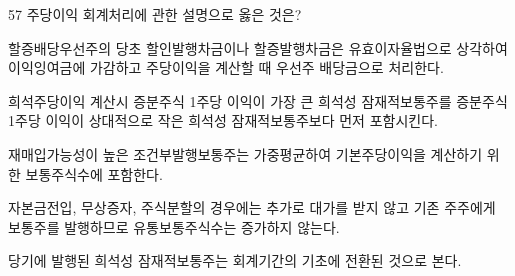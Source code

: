 \begin{question}{57}
주당이익 회계처리에 관한 설명으로 옳은 것은?
\begin{choices}
  \item 할증배당우선주의 당초 할인발행차금이나 할증발행차금은 유효이자율법으로 상각하여 이익잉여금에 가감하고 주당이익을 계산할 때 우선주 배당금으로 처리한다.
  \item 희석주당이익 계산시 증분주식 1주당 이익이 가장 큰 희석성 잠재적보통주를 증분주식 1주당 이익이 상대적으로 작은 희석성 잠재적보통주보다 먼저 포함시킨다.
  \item 재매입가능성이 높은 조건부발행보통주는 가중평균하여 기본주당이익을 계산하기 위한 보통주식수에 포함한다.
  \item 자본금전입, 무상증자, 주식분할의 경우에는 추가로 대가를 받지 않고 기존 주주에게 보통주를 발행하므로 유통보통주식수는 증가하지 않는다.
  \item 당기에 발행된 희석성 잠재적보통주는 회계기간의 기초에 전환된 것으로 본다.
\end{choices}
\end{question}
